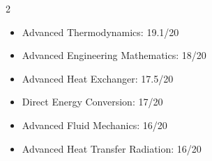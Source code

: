 %
%
%


\begin{multicols}{2}
  \begin{itemize}
    \item Advanced Thermodynamics: 19.1/20
    \item Advanced Engineering Mathematics: 18/20
    \item Advanced Heat Exchanger: 17.5/20
    \item Direct Energy Conversion: 17/20
    \item Advanced Fluid Mechanics: 16/20
    \item Advanced Heat Transfer Radiation: 16/20
  \end{itemize}
\end{multicols}

\vspace{-5pt}
